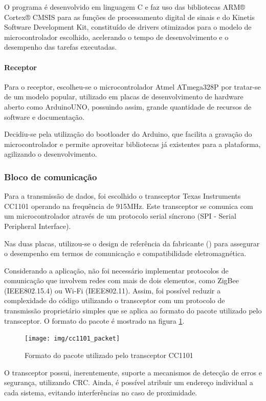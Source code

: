 \documentclass[10pt,a4paper]{article}
\begin{document}
\begin{multicols*}{2}
O programa é desenvolvido em linguagem C e faz uso das bibliotecas ARM® Cortex® CMSIS para as funções de processamento digital de sinais e do Kinetis Software Development Kit, constituído de drivers otimizados para o modelo de microcontrolador escolhido, acelerando o tempo de desenvolvimento e o desempenho das tarefas executadas.
		
\paragraph{Receptor}
Para o receptor, escolheu-se o microcontrolador Atmel ATmega328P por tratar-se de um modelo popular, utilizado em placas de desenvolvimento de hardware aberto como Arduino\textregistered UNO, possuindo assim, grande quantidade de recursos de software e documentação.

Decidiu-se pela utilização do bootloader do Arduino, que facilita a gravação do microcontrolador e permite aproveitar bibliotecas já existentes para a plataforma, agilizando o desenvolvimento.
				
\subsubsection{Bloco de comunicação}
Para a transmissão de dados, foi escolhido o transceptor Texas Instruments
CC1101 operando na frequência de 915MHz. Este transceptor se comunica com um microcontrolador através de um protocolo serial síncrono (SPI - Serial Peripheral Interface).
				
Nas duas placas, utilizou-se o design de referência da fabricante (\cite{cc1101_design}) para assegurar o desempenho em termos de comunicação e compatibilidade eletromagnética.

Considerando a aplicação, não foi necessário implementar protocolos de comunicação que involvem redes com mais de dois elementos, como ZigBee (IEEE802.15.4) ou Wi-Fi (IEEE802.11). Assim, foi possível reduzir a complexidade do código utilizando o transceptor com um protocolo de transmissão proprietário simples que se aplica ao formato do pacote utilizado pelo transceptor. O formato do pacote é mostrado na figura \ref{fig:cc1101packet}.

\begin{figure}[H]
	\centering
	\texttt{[image: img/cc1101\_packet]}
	\caption{Formato do pacote utilizado pelo transceptor CC1101}
	\label{fig:cc1101packet}
\end{figure}

O transceptor possui, inerentemente, suporte a mecanismos de detecção de erros e segurança, utilizando CRC. Ainda, é possível atribuir um endereço individual a cada sistema, evitando interferências no caso de proximidade.
				

\end{multicols*}
\end{document}
